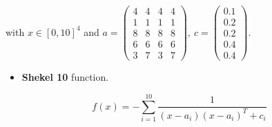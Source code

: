 \documentclass[symmetry,article,submit,moreauthors,pdftex]{Definitions/mdpi}
\begin{document}
with $x\in[0,10]^{4}$ and $a=\left(\begin{array}{cccc}
4 & 4 & 4 & 4\\
1 & 1 & 1 & 1\\
8 & 8 & 8 & 8\\
6 & 6 & 6 & 6\\
3 & 7 & 3 & 7
\end{array}\right),\ c=\left(\begin{array}{c}
0.1\\
0.2\\
0.2\\
0.4\\
0.4
\end{array}\right)$.
\begin{itemize}
\item \textbf{Shekel 10} function.
\end{itemize}
\[
f(x)=-\sum_{i=1}^{10}\frac{1}{(x-a_{i})(x-a_{i})^{T}+c_{i}}
\]
 
\end{document}
